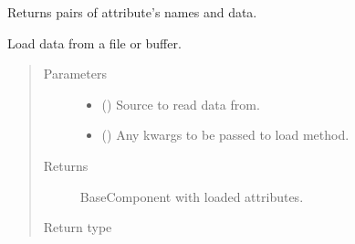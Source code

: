 \documentclass[letterpaper,10pt,english]{sphinxmanual}
\begin{document}
\begin{fulllineitems}
\begin{fulllineitems}
\label{\detokenize{api/base_classes:geology.src.base_component.BaseComponent.items}}
Returns pairs of attribute’s names and data.

\end{fulllineitems}


\begin{fulllineitems}
\label{\detokenize{api/base_classes:geology.src.base_component.BaseComponent.load}}
Load data from a file or buffer.
\begin{quote}\begin{description}
\item[{Parameters}] \leavevmode\begin{itemize}
\item {} 
 () \textendash{} Source to read data from.

\item {} 
 (\sphinxstyleliteralemphasis{\sphinxupquote{, }}) \textendash{} Any kwargs to be passed to load method.

\end{itemize}

\item[{Returns}] \leavevmode
{} \textendash{} BaseComponent with loaded attributes.

\item[{Return type}] \leavevmode
{\hyperref[\detokenize{api/base_classes:geology.src.base_component.BaseComponent}]{}}

\end{description}\end{quote}

\end{fulllineitems}



\end{fulllineitems}
\end{document}
